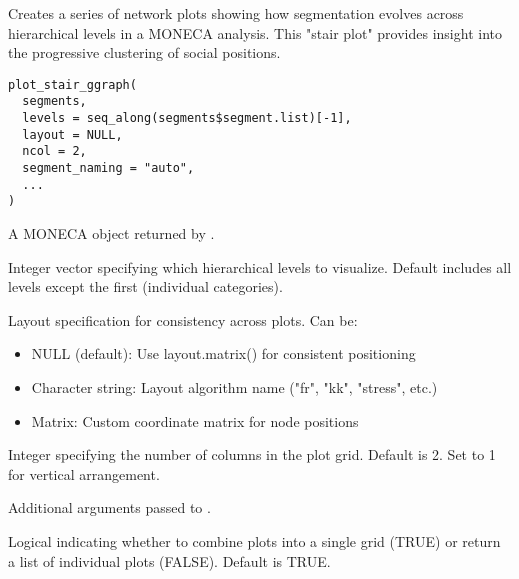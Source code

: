 \documentclass[a4paper]{book}
\begin{document}
%
\begin{Description}
Creates a series of network plots showing how segmentation evolves across
hierarchical levels in a MONECA analysis. This "stair plot" provides insight
into the progressive clustering of social positions.
\end{Description}
%
\begin{Usage}
\begin{verbatim}
plot_stair_ggraph(
  segments,
  levels = seq_along(segments$segment.list)[-1],
  layout = NULL,
  ncol = 2,
  segment_naming = "auto",
  ...
)
\end{verbatim}
\end{Usage}
%
\begin{Arguments}
\begin{ldescription}
\item[\code{segments}] A MONECA object returned by .

\item[\code{levels}] Integer vector specifying which hierarchical levels to visualize.
Default includes all levels except the first (individual categories).

\item[\code{layout}] Layout specification for consistency across plots. Can be:
\begin{itemize}

\item{} NULL (default): Use layout.matrix() for consistent positioning
\item{} Character string: Layout algorithm name ("fr", "kk", "stress", etc.)
\item{} Matrix: Custom coordinate matrix for node positions

\end{itemize}


\item[\code{ncol}] Integer specifying the number of columns in the plot grid.
Default is 2. Set to 1 for vertical arrangement.

\item[\code{...}] Additional arguments passed to .

\item[\code{combine\_plots}] Logical indicating whether to combine plots into a single
grid (TRUE) or return a list of individual plots (FALSE). Default is TRUE.
\end{ldescription}
\end{Arguments}
\end{document}

